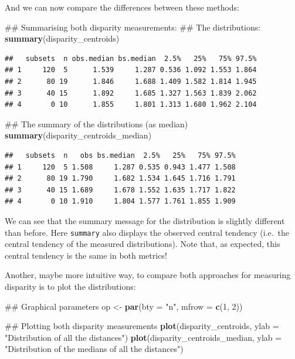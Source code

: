 \documentclass[]{book}
\newenvironment{Shaded}{\begin{snugshade}}{\end{snugshade}}
\newcommand{\KeywordTok}[1]{\textcolor[rgb]{0.13,0.29,0.53}{\textbf{#1}}}
\newcommand{\DataTypeTok}[1]{\textcolor[rgb]{0.13,0.29,0.53}{#1}}
\newcommand{\DecValTok}[1]{\textcolor[rgb]{0.00,0.00,0.81}{#1}}
\newcommand{\StringTok}[1]{\textcolor[rgb]{0.31,0.60,0.02}{#1}}
\newcommand{\NormalTok}[1]{#1}
\theoremstyle{definition}
\theoremstyle{definition}
\theoremstyle{definition}
\theoremstyle{remark}
\begin{document}
And we can now compare the differences between these methods:

\begin{Shaded}
\begin{Highlighting}[]
\NormalTok{## Summarising both disparity measurements:}
\NormalTok{## The distributions:}
\KeywordTok{summary}\NormalTok{(disparity_centroids)}
\end{Highlighting}
\end{Shaded}

\begin{verbatim}
##   subsets  n obs.median bs.median  2.5%   25%   75% 97.5%
## 1     120  5      1.539     1.287 0.536 1.092 1.553 1.864
## 2      80 19      1.846     1.688 1.409 1.582 1.814 1.945
## 3      40 15      1.892     1.685 1.327 1.563 1.839 2.062
## 4       0 10      1.855     1.801 1.313 1.680 1.962 2.104
\end{verbatim}

\begin{Shaded}
\begin{Highlighting}[]
\NormalTok{## The summary of the distributions (as median)}
\KeywordTok{summary}\NormalTok{(disparity_centroids_median)}
\end{Highlighting}
\end{Shaded}

\begin{verbatim}
##   subsets  n   obs bs.median  2.5%   25%   75% 97.5%
## 1     120  5 1.508     1.287 0.535 0.943 1.477 1.508
## 2      80 19 1.790     1.682 1.534 1.645 1.716 1.791
## 3      40 15 1.689     1.678 1.552 1.635 1.717 1.822
## 4       0 10 1.910     1.804 1.577 1.761 1.855 1.909
\end{verbatim}

We can see that the summary message for the distribution is slightly
different than before. Here \texttt{summary} also displays the observed
central tendency (i.e.~the central tendency of the measured
distributions). Note that, as expected, this central tendency is the
same in both metrics!

Another, maybe more intuitive way, to compare both approaches for
measuring disparity is to plot the distributions:

\begin{Shaded}
\begin{Highlighting}[]
\NormalTok{## Graphical parameters}
\NormalTok{op <-}\StringTok{ }\KeywordTok{par}\NormalTok{(}\DataTypeTok{bty =} \StringTok{"n"}\NormalTok{, }\DataTypeTok{mfrow =} \KeywordTok{c}\NormalTok{(}\DecValTok{1}\NormalTok{, }\DecValTok{2}\NormalTok{))}

\NormalTok{## Plotting both disparity measurements}
\KeywordTok{plot}\NormalTok{(disparity_centroids, }\DataTypeTok{ylab =} \StringTok{"Distribution of all the distances"}\NormalTok{)}
\KeywordTok{plot}\NormalTok{(disparity_centroids_median,}
     \DataTypeTok{ylab =} \StringTok{"Distribution of the medians of all the distances"}\NormalTok{)}
\end{Highlighting}
\end{Shaded}
\end{document}
